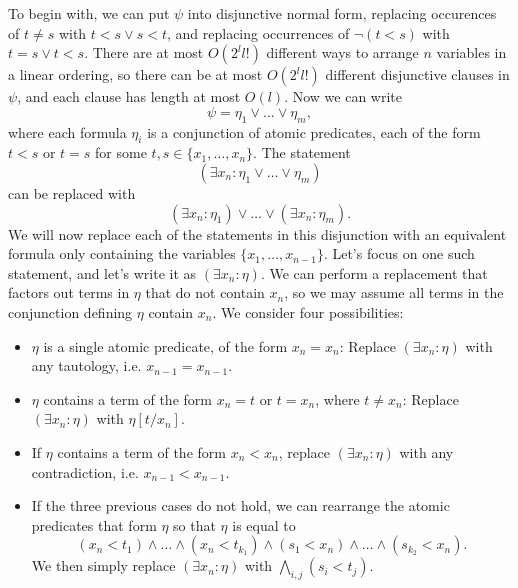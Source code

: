 \begin{example}
    To begin with, we can put $\psi$ into disjunctive normal form, replacing occurences of $t \neq s$ with $t < s \vee s < t$, and replacing occurrences of $\neg (t < s)$ with $t = s \vee t < s$. There are at most $O(2^l l!)$ different ways to arrange $n$ variables in a linear ordering, so there can be at most $O(2^l l!)$ different disjunctive clauses in $\psi$, and each clause has length at most $O(l)$.
    Now we can write
    \[ \psi = \eta_1 \vee \dots \vee \eta_m, \]
    where each formula $\eta_i$ is a conjunction of atomic predicates, each of the form $t < s$ or $t = s$ for some $t,s \in \{ x_1, \dots, x_n \}$. The statement
    \[ (\exists x_n: \eta_1 \vee \dots \vee \eta_m) \]
    can be replaced with 
    \[ (\exists x_n : \eta_1) \vee \dots \vee (\exists x_n: \eta_m). \]
    We will now replace each of the statements in this disjunction with an equivalent formula only containing the variables $\{ x_1, \dots, x_{n-1} \}$. Let's focus on one such statement, and let's write it as $(\exists x_n: \eta)$. We can perform a replacement that factors out terms in $\eta$ that do not contain $x_n$, so we may assume all terms in the conjunction defining $\eta$ contain $x_n$. We consider four possibilities:
    \begin{itemize}
        \item $\eta$ is a single atomic predicate, of the form $x_n = x_n$: Replace $(\exists x_n: \eta)$ with any tautology, i.e. $x_{n-1} = x_{n-1}$.
        \item $\eta$ contains a term of the form $x_n = t$ or $t = x_n$, where $t \neq x_n$: Replace $(\exists x_n: \eta)$ with $\eta[t/x_n]$.
        \item If $\eta$ contains a term of the form $x_n < x_n$, replace $(\exists x_n: \eta)$ with any contradiction, i.e. $x_{n-1} < x_{n-1}$.
        \item If the three previous cases do not hold, we can rearrange the atomic predicates that form $\eta$ so that $\eta$ is equal to
        \[ (x_n < t_1) \wedge \dots \wedge (x_n < t_{k_1}) \wedge (s_1 < x_n) \wedge \dots \wedge (s_{k_2} < x_n). \]
        We then simply replace $(\exists x_n: \eta)$ with $\bigwedge_{i,j} (s_i < t_j)$.
    \end{itemize}

\end{example}
